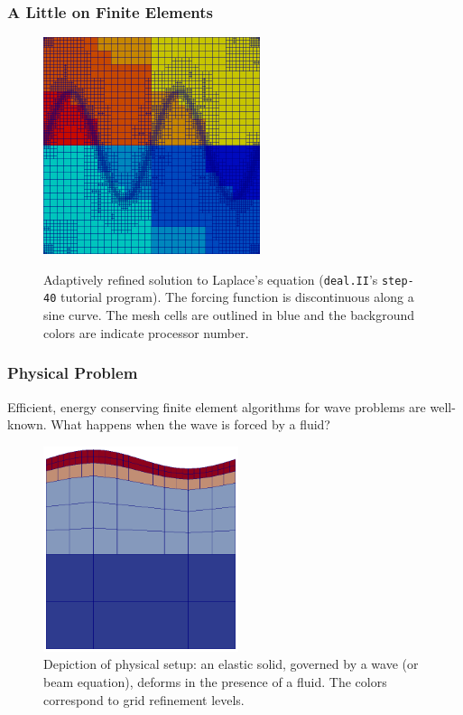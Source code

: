 \documentclass[8pt]{beamer}
\begin{document}
\begin{frame}
    \frametitle{A Little on Finite Elements}

    \begin{figure}
        \centering

        \includegraphics[width=2.5in]{adaptive-mesh}

        Adaptively refined solution to Laplace's equation (\texttt{deal.II}'s
        \cite{dealii-84} \texttt{step-40} tutorial program). The forcing
        function is discontinuous along a sine curve. The mesh cells are
        outlined in blue and the background colors are indicate processor
        number.
    \end{figure}
\end{frame}


\begin{frame}
    \frametitle{Physical Problem}
    Efficient, energy conserving finite element algorithms for wave problems are
    well-known. What happens when the wave is forced by a fluid?

    \begin{figure}
        \centering
        \includegraphics[width=2.25in]{refined-roof-wave.png}

        \caption{Depiction of physical setup: an elastic solid, governed by a
        wave (or beam equation), deforms in the presence of a fluid. The colors
        correspond to grid refinement levels.}
    \end{figure}
\end{frame}
\end{document}
